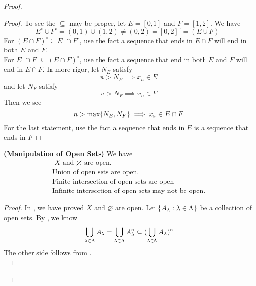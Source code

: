 \documentclass{report}
\begin{document}
\begin{proof}
\begin{proof}
To see the $\subseteq$ may be proper, let $E=[0,1]$ and $F=[1,2]$. We have
\begin{equation}
E^\circ \cup F^\circ= (0,1)\cup (1,2)\neq (0,2)=[0,2]^\circ =(E\cup F)^\circ 
\end{equation}
For $(E\cap F)^\circ \subseteq E^\circ \cap F^\circ $, use the fact a sequence that ends in $E\cap F$ will end in both $E$ and  $F$.\\

For $E^\circ \cap F^\circ \subseteq (E\cap F)^\circ $, use the fact a sequence that end in both $E$ and  $F$ will end in  $E\cap F$. In more rigor, let $N_E$ satisfy
 \begin{equation}
n>N_E\implies x_n\in E
\end{equation}
and let $N_F$ satisfy
\begin{equation}
n>N_F\implies x_n\in F
\end{equation}
Then we see
\begin{equation}
n>\max \{ N_E,N_F \}\implies x_n\in E\cap F
\end{equation}
For the last statement, use the fact a sequence that ends in $E$ is a sequence that ends in  $F$
\end{proof}
\begin{theorem}
\label{1.3.5}
\textbf{(Manipulation of Open Sets)} We have
\begin{gather}
\text{ $X$ and  $\varnothing$ are open. }\\
\text{ Union of open sets are open. }\\
\text{ Finite intersection of open sets are open}\\
\text{ Infinite intersection of open sets may not be open. }
\end{gather}
\end{theorem}
\begin{proof}
In , we have proved $X$ and $\varnothing$ are open. Let $\{ A_\lambda :\lambda \in\Lambda  \}$ be a collection of open sets. By , we know
\begin{equation}
\bigcup_{\lambda \in \Lambda } A_\lambda= \bigcup_{\lambda  \in \Lambda }A_\lambda ^\circ \subseteq (\bigcup_{\lambda  \in \Lambda } A_\lambda )^\circ 
\end{equation}
The other side follows from .\\


\end{proof}
\end{proof}
\end{document}
